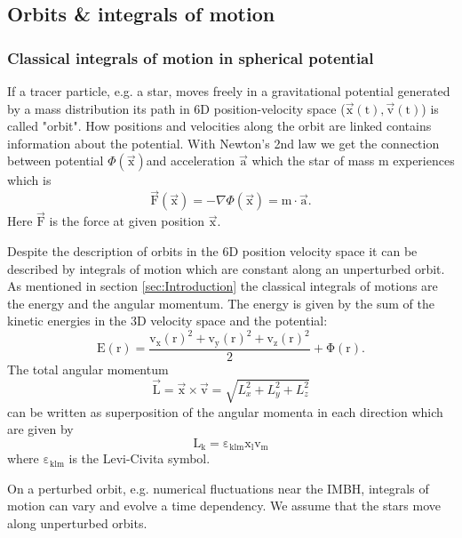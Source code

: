 \subsection{Orbits \& integrals of motion}\label{sec:orbit_int_of_motion_theory}
\subsubsection{Classical integrals of motion in spherical potential}\label{sec:iof}
If a tracer particle, e.g. a star, moves freely in a gravitational potential generated by a mass distribution its path in 6D position-velocity space (\(\vec{\mathrm{x}}(\mathrm{t}),\vec{\mathrm{v}}(\mathrm{t})\)) is called "orbit".
How positions and velocities along the orbit are linked contains information about the potential. With Newton's 2nd law we get the connection between potential \(\Phi(\vec{\mathrm{x}})\)and acceleration \(\vec{\mathrm{a}}\) which the star of mass m experiences which is 
\begin{equation}\label{eq:Newton}
\vec{\mathrm{F}}(\vec{\mathrm{x}})=-\nabla\Phi(\vec{\mathrm{x}})=\mathrm{m}\cdot\vec{\mathrm{a}}.  
\end{equation}
Here \(\vec{\mathrm{F}}\) is the force at given position \(\vec{\mathrm{x}}\).
\par Despite the description of orbits in the 6D position velocity space it can be described by integrals of motion which are constant along an unperturbed orbit. As mentioned in section \ref{sec:Introduction} the classical integrals of motions are the energy and the angular momentum. The energy is given by the sum of the kinetic energies in the 3D velocity space and the potential:
\begin{equation}\label{eq:energy}
\mathrm{E(r)=\frac{v_x(r)^2+v_y(r)^2+v_z(r)^2}{2}+\Phi(r)}.
\end{equation}
The total angular momentum
\begin{equation}\label{eq:total_ang_mom}
\vec{\mathrm{L}}=\vec{\mathrm{x}}\times\vec{\mathrm{v}}=\sqrt{L_x^2+L_y^2+L_z^2}
\end{equation}
can be written as superposition of the angular momenta in each direction which are given by 
\begin{equation}\label{eq:ang_mom}
\mathrm{L_k=\varepsilon_{klm}x_l v_m}
\end{equation}
where \(\mathrm{\varepsilon_{klm}}\) is the Levi-Civita symbol.  
\par On a perturbed orbit, e.g. numerical fluctuations near the \ac{IMBH}, integrals of motion can vary and evolve a time dependency. We assume that the stars move along unperturbed orbits. 

